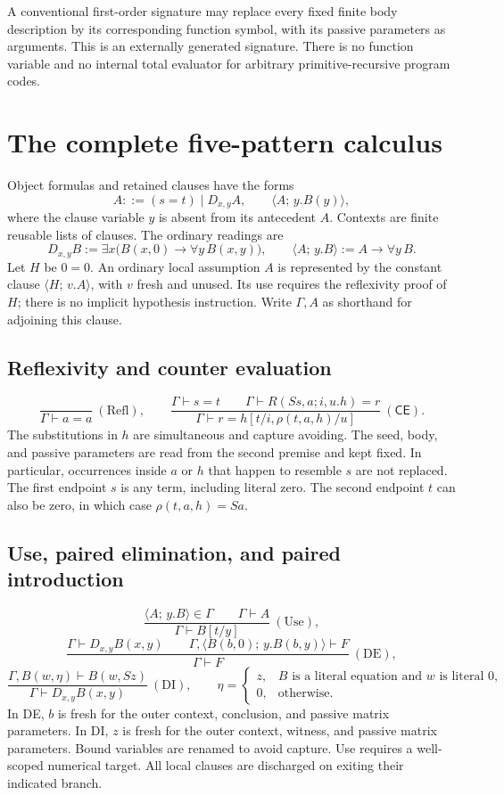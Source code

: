 \documentclass[11pt,letterpaper]{article}
\theoremstyle{definition}
\newcommand{\CE}{\mathsf{CE}}
\newcommand{\cl}[2]{\langle #1;\,#2\rangle}
\begin{document}
A conventional first-order signature may replace every fixed finite
body description by its corresponding function symbol, with its passive
parameters as arguments. This is an externally generated signature.
There is no function variable and no internal total evaluator for
arbitrary primitive-recursive program codes.

\section{The complete five-pattern calculus}
\label{sec:rules}

Object formulas and retained clauses have the forms
\[
 A::=(s=t)\mid D_{x,y}A,\qquad
 \cl{A}{y.B(y)},
\]
where the clause variable $y$ is absent from its antecedent $A$.
Contexts are finite reusable lists of clauses. The ordinary readings are
\[
 D_{x,y}B:=\exists x\bigl(B(x,0)\to\forall y\,B(x,y)\bigr),
 \qquad
 \cl{A}{y.B}:=A\to\forall y\,B.
\]
Let $H$ be $0=0$. An ordinary local assumption $A$ is represented by
the constant clause $\cl{H}{v.A}$, with $v$ fresh and unused. Its use
requires the reflexivity proof of $H$; there is no implicit hypothesis
instruction. Write $\Gamma,A$ as shorthand for adjoining this clause.

\subsection{Reflexivity and counter evaluation}
\[
 \frac{}{\Gamma\vdash a=a}\ (\mathrm{Refl}),
 \qquad
 \frac{\Gamma\vdash s=t\qquad
       \Gamma\vdash R(Ss,a;i,u.h)=r}
      {\Gamma\vdash r=h[t/i,\rho(t,a,h)/u]}\ (\CE).
 \tag{Arithmetic}
\]
The substitutions in $h$ are simultaneous and capture avoiding.
The seed, body, and passive parameters are read from the second
premise and kept fixed. In particular, occurrences inside $a$ or $h$
that happen to resemble $s$ are not replaced. The first endpoint $s$
is any term, including literal zero. The second endpoint $t$ can
also be zero, in which case $\rho(t,a,h)=Sa$.

\subsection{Use, paired elimination, and paired introduction}
\[
 \frac{\cl{A}{y.B}\in\Gamma\qquad\Gamma\vdash A}
      {\Gamma\vdash B[t/y]}\ (\mathrm{Use}),
\]
\[
 \frac{\Gamma\vdash D_{x,y}B(x,y)\qquad
       \Gamma,\cl{B(b,0)}{y.B(b,y)}\vdash F}
      {\Gamma\vdash F}\ (\mathrm{DE}),
\]
\[
 \frac{\Gamma,B(w,\eta)\vdash B(w,Sz)}
      {\Gamma\vdash D_{x,y}B(x,y)}\ (\mathrm{DI}),
 \qquad
 \eta=\begin{cases}
 z,&B\text{ is a literal equation and }w\text{ is literal }0,\\
 0,&\text{otherwise}.
 \end{cases}
\]
In DE, $b$ is fresh for the outer context, conclusion, and passive
matrix parameters. In DI, $z$ is fresh for the outer context, witness,
and passive matrix parameters. Bound variables are renamed to avoid
capture. Use requires a well-scoped numerical target. All local clauses
are discharged on exiting their indicated branch.
\end{document}
